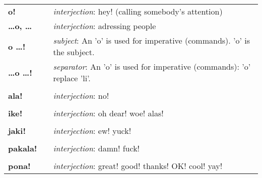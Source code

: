 \begin{supertabular}{p{2,5cm}|ll}
    \textbf{o!}              &  & \textit{interjection}: hey! (calling somebody's attention)                                   \\ %
    \textbf{\dots o, \dots}  &  & \textit{interjection}: adressing people                                                      \\ %
    \textbf{o \dots !}       &  & \textit{subject}: An 'o' is used for imperative (commands). 'o' is the subject.              \\ %
    \textbf{\dots o \dots !} &  & \textit{separator}: An 'o' is used for imperative (commands): 'o' replace 'li'.              \\ %
                             &  &                                                                                              \\ %
    \textbf{ala!}            &  & \textit{interjection}: no!                                                                   \\ %
                             &  &                                                                                              \\ %
    \textbf{ike!}            &  & \textit{interjection}: oh dear! woe! alas!                                                   \\ %
                             &  &                                                                                              \\ %
    \textbf{jaki!}           &  & \textit{interjection}: ew! yuck!                                                             \\ %
                             &  &                                                                                              \\ %
    \textbf{pakala!}         &  & \textit{interjection}: damn! fuck!                                                           \\ %
                             &  &                                                                                              \\ %
    \textbf{pona!}           &  & \textit{interjection}: great! good! thanks! OK! cool! yay!                                   \\ %

\end{supertabular}
